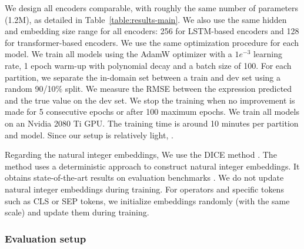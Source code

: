 We design all encoders comparable, with roughly the same number of parameters (1.2M), as detailed in Table~\ref{table:results-main}. We also use the same hidden and embedding size range for all encoders: 256 for LSTM-based encoders and 128 for transformer-based encoders. We use the same optimization procedure for each model.
We train all models using the AdamW optimizer \parencite{loshchilov_19} with a $1e^{-3}$ learning rate, 1 epoch warm-up with polynomial decay and a batch size of 100. For each partition, we separate the in-domain set between a train and dev set using a random 90/10\% split. We measure the RMSE between the expression predicted and the true value on the dev set. We stop the training when no improvement is made for 5 consecutive epochs or after 100 maximum epochs. We train all models on an Nvidia 2080 Ti GPU. The training time is around 10 minutes per partition and model. Since our setup is relatively light, .

Regarding the natural integer embeddings, We use the DICE method \parencite{sundararaman_20}. The method uses a deterministic approach to construct natural integer embeddings. It obtains state-of-the-art results on evaluation benchmarks \parencite{wallace_19}. We do not update natural integer embeddings during training. For operators and specific tokens such as CLS or SEP tokens, we initialize embeddings randomly (with the same scale) and update them during training. 

\subsubsection{Evaluation setup}

